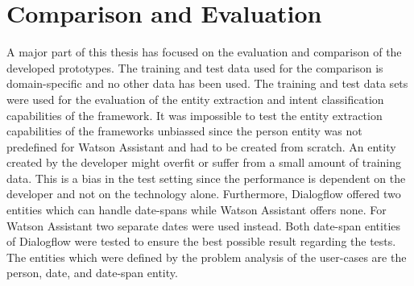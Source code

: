 \section{Comparison and Evaluation}
A major part of this thesis has focused on the evaluation and comparison of the 
developed prototypes.
The training and test data used for the comparison is domain-specific and no other 
data has been used.
The training and test data sets were used for the evaluation of the entity extraction and 
intent classification capabilities of the framework.
It was impossible to test the entity extraction capabilities of the frameworks unbiassed since 
the person entity was not predefined for Watson Assistant and had to be created from scratch.
An entity created by the developer might overfit or suffer from a small amount of training data.
This is a bias in the test setting since the performance is dependent on the developer and not 
on the technology alone.
Furthermore, Dialogflow offered two entities which can handle date-spans while Watson Assistant offers none.
For Watson Assistant two separate dates were used instead.
Both date-span entities of Dialogflow were tested to ensure the best possible result regarding the tests.
The entities which were defined by the problem analysis of the user-cases are the person, date, and date-span entity.




